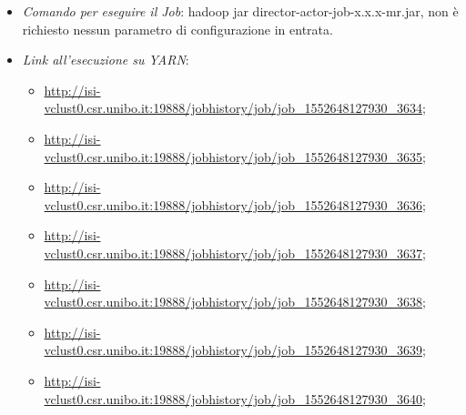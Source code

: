 \documentclass[hidelinks]{article}
\begin{document}
\begin{itemize}
	\item \textit{Comando per eseguire il Job}: hadoop jar director-actor-job-x.x.x-mr.jar, non è richiesto nessun parametro di configurazione in entrata.
	\item \textit{Link all'esecuzione su YARN}:
	\begin{itemize}
		\item \url{http://isi-vclust0.csr.unibo.it:19888/jobhistory/job/job\_1552648127930\_3634};
		\item \url{http://isi-vclust0.csr.unibo.it:19888/jobhistory/job/job\_1552648127930\_3635}; 
		\item \url{http://isi-vclust0.csr.unibo.it:19888/jobhistory/job/job\_1552648127930\_3636};
		\item \url{http://isi-vclust0.csr.unibo.it:19888/jobhistory/job/job\_1552648127930\_3637};
		\item \url{http://isi-vclust0.csr.unibo.it:19888/jobhistory/job/job\_1552648127930\_3638};
		\item \url{http://isi-vclust0.csr.unibo.it:19888/jobhistory/job/job\_1552648127930\_3639};
			\item \url{http://isi-vclust0.csr.unibo.it:19888/jobhistory/job/job\_1552648127930\_3640};
	\end{itemize}
	

\end{itemize}
\end{document}
